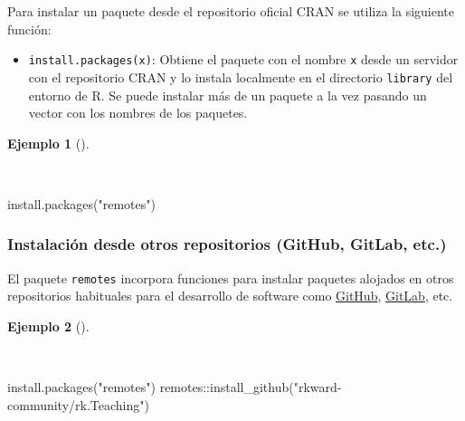 \documentclass[
  a4paper,
]{scrreport}
\newenvironment{Shaded}{\begin{snugshade}}{\end{snugshade}}
\newcommand{\FunctionTok}[1]{\textcolor[rgb]{0.28,0.35,0.67}{#1}}
\newcommand{\NormalTok}[1]{\textcolor[rgb]{0.00,0.23,0.31}{#1}}
\newcommand{\SpecialCharTok}[1]{\textcolor[rgb]{0.37,0.37,0.37}{#1}}
\newcommand{\StringTok}[1]{\textcolor[rgb]{0.13,0.47,0.30}{#1}}
\providecommand{\tightlist}{%
  \setlength{\itemsep}{0pt}\setlength{\parskip}{0pt}}\usepackage{longtable,booktabs,array}
\theoremstyle{definition}
\theoremstyle{definition}
\newtheorem{example}{Ejemplo}[chapter]
\theoremstyle{remark}
\begin{document}
Para instalar un paquete desde el repositorio oficial CRAN se utiliza la
siguiente función:

\begin{itemize}
\tightlist
\item
  \texttt{install.packages(x)}: Obtiene el paquete con el nombre
  \texttt{x} desde un servidor con el repositorio CRAN y lo instala
  localmente en el directorio \texttt{library} del entorno de R. Se
  puede instalar más de un paquete a la vez pasando un vector con los
  nombres de los paquetes.
\end{itemize}

\begin{example}[]\protect\hypertarget{exm-instalacion-paquetes}{}\label{exm-instalacion-paquetes}

~

\begin{Shaded}
\begin{Highlighting}[]
\FunctionTok{install.packages}\NormalTok{(}\StringTok{"remotes"}\NormalTok{)}
\end{Highlighting}
\end{Shaded}

\end{example}

\hypertarget{instalaciuxf3n-desde-otros-repositorios-github-gitlab-etc.}{%
\subsubsection{Instalación desde otros repositorios (GitHub, GitLab,
etc.)}\label{instalaciuxf3n-desde-otros-repositorios-github-gitlab-etc.}}

El paquete \texttt{remotes} incorpora funciones para instalar paquetes
alojados en otros repositorios habituales para el desarrollo de software
como \href{https://github.com/}{GitHub},
\href{httpsb://gitlab.com/}{GitLab}, etc.

\begin{example}[]\protect\hypertarget{exm-instalacion-paquetes-github}{}\label{exm-instalacion-paquetes-github}

~

\begin{Shaded}
\begin{Highlighting}[]
\FunctionTok{install.packages}\NormalTok{(}\StringTok{"remotes"}\NormalTok{)}
\NormalTok{remotes}\SpecialCharTok{::}\FunctionTok{install\_github}\NormalTok{(}\StringTok{"rkward{-}community/rk.Teaching"}\NormalTok{)}
\end{Highlighting}
\end{Shaded}

\end{example}
\end{document}
